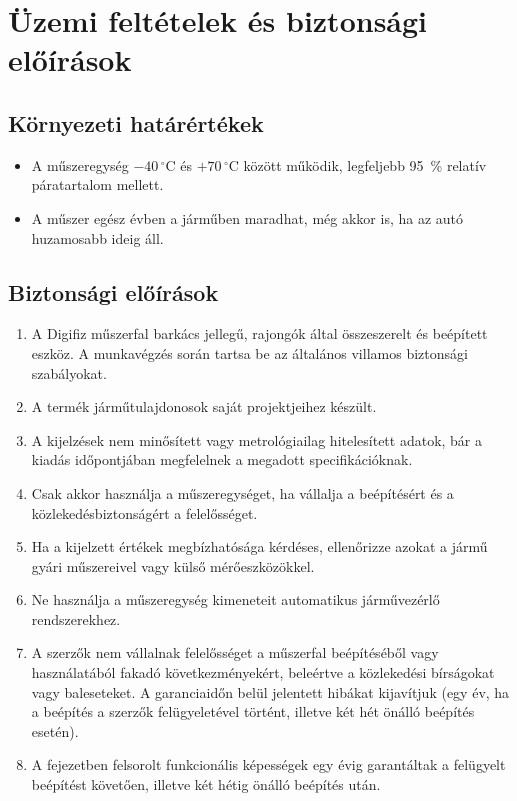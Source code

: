 \chapter{Üzemi feltételek és biztonsági előírások}\label{ch:safety}

\section{Környezeti határértékek}
\begin{itemize}
    \item A műszeregység \(-40\,^{\circ}\mathrm{C}\) és \(+70\,^{\circ}\mathrm{C}\) között működik, legfeljebb 95~\% relatív páratartalom mellett.
    \item A műszer egész évben a járműben maradhat, még akkor is, ha az autó huzamosabb ideig áll.
\end{itemize}

\section{Biztonsági előírások}
\begin{enumerate}
    \item A Digifiz műszerfal barkács jellegű, rajongók által összeszerelt és beépített eszköz. A munkavégzés során tartsa be az általános villamos biztonsági szabályokat.
    \item A termék járműtulajdonosok saját projektjeihez készült.
    \item A kijelzések nem minősített vagy metrológiailag hitelesített adatok, bár a kiadás időpontjában megfelelnek a megadott specifikációknak.
    \item Csak akkor használja a műszeregységet, ha vállalja a beépítésért és a közlekedésbiztonságért a felelősséget.
    \item Ha a kijelzett értékek megbízhatósága kérdéses, ellenőrizze azokat a jármű gyári műszereivel vagy külső mérőeszközökkel.
    \item Ne használja a műszeregység kimeneteit automatikus járművezérlő rendszerekhez.
    \item A szerzők nem vállalnak felelősséget a műszerfal beépítéséből vagy használatából fakadó következményekért, beleértve a közlekedési bírságokat vagy baleseteket. A garanciaidőn belül jelentett hibákat kijavítjuk (egy év, ha a beépítés a szerzők felügyeletével történt, illetve két hét önálló beépítés esetén).
    \item A  fejezetben felsorolt funkcionális képességek egy évig garantáltak a felügyelt beépítést követően, illetve két hétig önálló beépítés után.
\end{enumerate}
